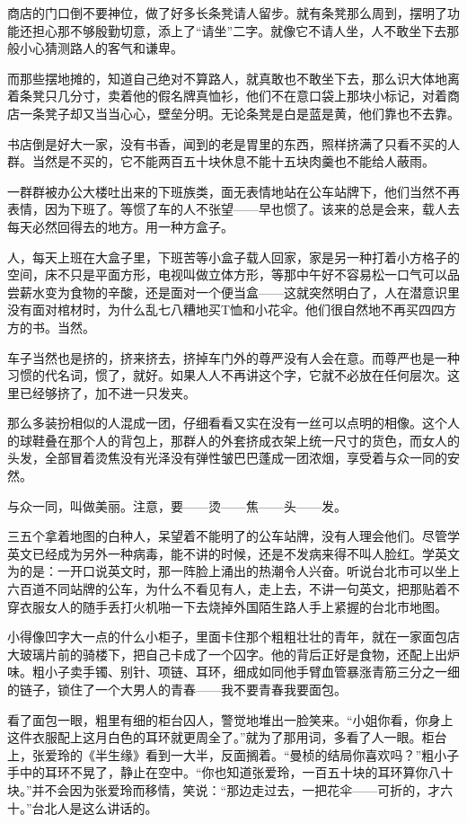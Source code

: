 \par 商店的门口倒不要神位，做了好多长条凳请人留步。就有条凳那么周到，摆明了功能还担心那不够殷勤切意，添上了“请坐”二字。就像它不请人坐，人不敢坐下去那般小心猜测路人的客气和谦卑。
\par 而那些摆地摊的，知道自己绝对不算路人，就真敢也不敢坐下去，那么识大体地离着条凳只几分寸，卖着他的假名牌真恤衫，他们不在意口袋上那块小标记，对着商店一条凳子却又当当心心，壁垒分明。无论条凳是白是蓝是黄，他们靠也不去靠。
\par 书店倒是好大一家，没有书香，闻到的老是胃里的东西，照样挤满了只看不买的人群。当然是不买的，它不能两百五十块休息不能十五块肉羹也不能给人蔽雨。
\par 一群群被办公大楼吐出来的下班族类，面无表情地站在公车站牌下，他们当然不再表情，因为下班了。等惯了车的人不张望——早也惯了。该来的总是会来，载人去每天必然回得去的地方。用一种方盒子。
\par 人，每天上班在大盒子里，下班苦等小盒子载人回家，家是另一种打着小方格子的空间，床不只是平面方形，电视叫做立体方形，等那中午好不容易松一口气可以品尝薪水变为食物的辛酸，还是面对一个便当盒——这就突然明白了，人在潜意识里没有面对棺材时，为什么乱七八糟地买T恤和小花伞。他们很自然地不再买四四方方的书。当然。
\par 车子当然也是挤的，挤来挤去，挤掉车门外的尊严没有人会在意。而尊严也是一种习惯的代名词，惯了，就好。如果人人不再讲这个字，它就不必放在任何层次。这里已经够挤了，加不进一只发夹。
\par 那么多装扮相似的人混成一团，仔细看看又实在没有一丝可以点明的相像。这个人的球鞋叠在那个人的背包上，那群人的外套挤成衣架上统一尺寸的货色，而女人的头发，全部冒着烫焦没有光泽没有弹性皱巴巴蓬成一团浓烟，享受着与众一同的安然。
\par 与众一同，叫做美丽。注意，要——烫——焦——头——发。
\par 三五个拿着地图的白种人，呆望着不能明了的公车站牌，没有人理会他们。尽管学英文已经成为另外一种病毒，能不讲的时候，还是不发病来得不叫人脸红。学英文为的是：一开口说英文时，那一阵脸上涌出的热潮令人兴奋。听说台北市可以坐上六百道不同站牌的公车，为什么不看见有人，走上去，不讲一句英文，把那贴着不穿衣服女人的随手丢打火机啪一下去烧掉外国陌生路人手上紧握的台北市地图。
\par 小得像凹字大一点的什么小柜子，里面卡住那个粗粗壮壮的青年，就在一家面包店大玻璃片前的骑楼下，把自己卡成了一个囚字。他的背后正好是食物，还配上出炉味。粗小子卖手镯、别针、项链、耳环，细成如同他手臂血管暴涨青筋三分之一细的链子，锁住了一个大男人的青春——我不要青春我要面包。
\par 看了面包一眼，粗里有细的柜台囚人，警觉地堆出一脸笑来。“小姐你看，你身上这件衣服配上这月白色的耳环就更周全了。”就为了那用词，多看了人一眼。柜台上，张爱玲的《半生缘》看到一大半，反面搁着。“曼桢的结局你喜欢吗？”粗小子手中的耳环不晃了，静止在空中。“你也知道张爱玲，一百五十块的耳环算你八十块。”并不会因为张爱玲而移情，笑说：“那边走过去，一把花伞——可折的，才六十。”台北人是这么讲话的。

